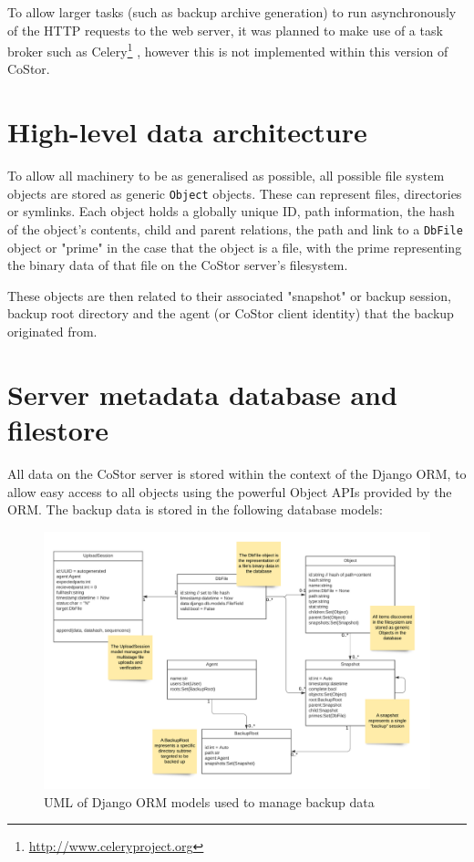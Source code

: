 \documentclass[bsc,frontabs,twoside,singlespacing,parskip,deptreport]{infthesis}     %
\begin{document}
To allow larger tasks (such as backup archive generation) to run asynchronously of the HTTP
requests to the web server, it was planned to make use of a task broker such as Celery\footnote{\url{http://www.celeryproject.org}} 
, however this is not implemented within this version of CoStor.

\section{High-level data architecture}

To allow all machinery to be as generalised as possible, all possible file system objects are stored
as generic \texttt{Object} objects. These can represent files, directories or symlinks. Each object
holds a globally unique ID, path information, the hash of the object's contents, child and parent 
relations, the path and link to a \texttt{DbFile} object or "prime" in the case that the object is
a file, with the prime representing the binary data of that file on the CoStor server's filesystem.

These objects are then related to their associated "snapshot" or backup session, backup root directory
and the agent (or CoStor client identity) that the backup originated from.

\section{Server metadata database and filestore}

All data on the CoStor server is stored within the context of the Django ORM, to allow easy access
to all objects using the powerful Object APIs provided by the ORM. The backup data is stored in the
following database models:

\begin{figure}[h]
	\includegraphics[width=0.82\paperwidth]{img/serverfileuml}
	\caption{UML of Django ORM models used to manage backup data}
	\label{serverdjangofileuml}
\end{figure}
\end{document}
